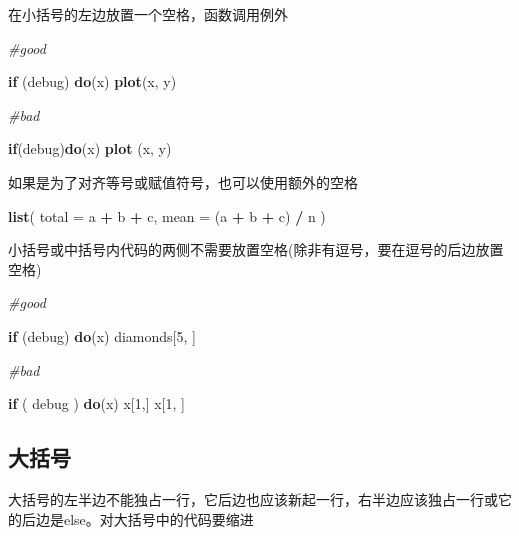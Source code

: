 \documentclass[]{book}
\newenvironment{Shaded}{\begin{snugshade}}{\end{snugshade}}
\newcommand{\KeywordTok}[1]{\textcolor[rgb]{0.13,0.29,0.53}{\textbf{#1}}}
\newcommand{\DataTypeTok}[1]{\textcolor[rgb]{0.13,0.29,0.53}{#1}}
\newcommand{\DecValTok}[1]{\textcolor[rgb]{0.00,0.00,0.81}{#1}}
\newcommand{\StringTok}[1]{\textcolor[rgb]{0.31,0.60,0.02}{#1}}
\newcommand{\CommentTok}[1]{\textcolor[rgb]{0.56,0.35,0.01}{\textit{#1}}}
\newcommand{\ControlFlowTok}[1]{\textcolor[rgb]{0.13,0.29,0.53}{\textbf{#1}}}
\newcommand{\OperatorTok}[1]{\textcolor[rgb]{0.81,0.36,0.00}{\textbf{#1}}}
\newcommand{\NormalTok}[1]{#1}
\begin{document}
在小括号的左边放置一个空格，函数调用例外

\begin{Shaded}
\begin{Highlighting}[]
\CommentTok{#good}

\ControlFlowTok{if}\NormalTok{ (debug) }\KeywordTok{do}\NormalTok{(x)}
\KeywordTok{plot}\NormalTok{(x, y)}

\CommentTok{#bad}

\ControlFlowTok{if}\NormalTok{(debug)}\KeywordTok{do}\NormalTok{(x)}
\KeywordTok{plot}\NormalTok{ (x, y)}
\end{Highlighting}
\end{Shaded}

如果是为了对齐等号或赋值符号，也可以使用额外的空格

\begin{Shaded}
\begin{Highlighting}[]
\KeywordTok{list}\NormalTok{(}
  \DataTypeTok{total =}\NormalTok{ a }\OperatorTok{+}\StringTok{ }\NormalTok{b }\OperatorTok{+}\StringTok{ }\NormalTok{c,}
  \DataTypeTok{mean  =}\NormalTok{ (a }\OperatorTok{+}\StringTok{ }\NormalTok{b }\OperatorTok{+}\StringTok{ }\NormalTok{c) }\OperatorTok{/}\StringTok{ }\NormalTok{n}
\NormalTok{)}
\end{Highlighting}
\end{Shaded}

小括号或中括号内代码的两侧不需要放置空格(除非有逗号，要在逗号的后边放置空格)

\begin{Shaded}
\begin{Highlighting}[]
\CommentTok{#good}

\ControlFlowTok{if}\NormalTok{ (debug) }\KeywordTok{do}\NormalTok{(x)}
\NormalTok{diamonds[}\DecValTok{5}\NormalTok{, ]}

\CommentTok{#bad }

\ControlFlowTok{if}\NormalTok{ ( debug ) }\KeywordTok{do}\NormalTok{(x)}
\NormalTok{x[}\DecValTok{1}\NormalTok{,]}
\NormalTok{x[}\DecValTok{1}\NormalTok{, ]}
\end{Highlighting}
\end{Shaded}

\subsection{大括号}

大括号的左半边不能独占一行，它后边也应该新起一行，右半边应该独占一行或它的后边是else。对大括号中的代码要缩进
\end{document}
